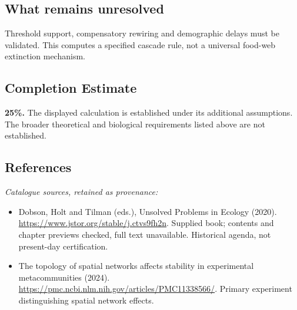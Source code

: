 \documentclass[11pt]{article}
\begin{document}
\subsection{What remains unresolved}
Threshold support, compensatory rewiring and demographic delays must be validated. This computes a specified cascade rule, not a universal food-web extinction mechanism.
\subsection{Completion Estimate}
\textbf{25\%.} The displayed calculation is established under its additional assumptions. The broader theoretical and biological requirements listed above are not established.
\subsection{References}
\noindent\emph{Catalogue sources, retained as provenance:}
\begin{itemize}
\item Dobson, Holt and Tilman (eds.), Unsolved Problems in Ecology (2020). \url{https://www.jstor.org/stable/j.ctvs9fh2n}. Supplied book; contents and chapter previews checked, full text unavailable. Historical agenda, not present-day certification.
\item The topology of spatial networks affects stability in experimental metacommunities (2024). \url{https://pmc.ncbi.nlm.nih.gov/articles/PMC11338566/}. Primary experiment distinguishing spatial network effects.
\end{itemize}
\clearpage


\appendix
\end{document}

